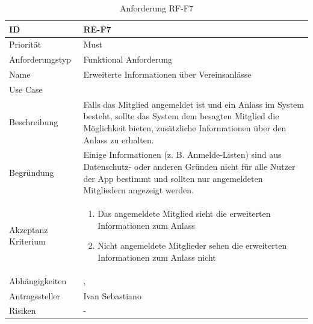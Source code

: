 \begin{table}[ht]
\centering
  \begin{tabular}{ l | p{8cm} }
	\hline
	\rowcolor{gray}
	ID 			&	\textbf{RE-F7}\\ \hline
	Priorität 		&	Must\\ \hline
	Anforderungstyp	&	Funktional Anforderung\\ \hline
	Name 			&	Erweiterte Informationen über Vereinsanlässe\\ \hline
	Use Case 		&	\nameref{table:use_case_5}\\ \hline
	Beschreibung 	&	Falls das Mitglied angemeldet ist und ein Anlass im System besteht, sollte das System dem besagten Mitglied die Möglichkeit bieten, zusätzliche Informationen über den Anlass zu erhalten.\\ \hline
	Begründung 		&	Einige Informationen (z. B. Anmelde-Listen) sind aus Datenschutz- oder anderen Gründen nicht für alle Nutzer der App bestimmt und sollten nur angemeldeten Mitgliedern angezeigt werden.\\ \hline
	Akzeptanz Kriterium	&	\begin{enumerate}
					\item Das angemeldete Mitglied sieht die erweiterten Informationen zum Anlass
					\item Nicht angemeldete Mitglieder sehen die erweiterten Informationen zum Anlass nicht
					\end{enumerate}
					\\ \hline
	Abhängigkeiten 	&	\nameref{table:req_1}, \nameref{table:req_6}\\ \hline
	Antragssteller 	&	Ivan Sebastiano\\ \hline
	Risiken	 	&	-
  \end{tabular}
   \caption{Anforderung RF-F7}\label{table:req_7}
\end{table}

